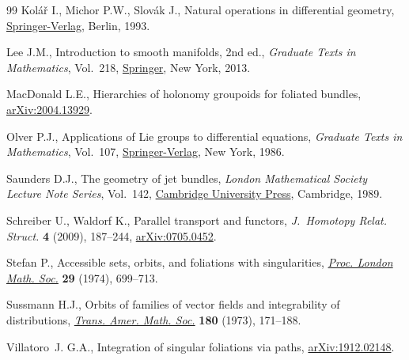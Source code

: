 \documentclass[11pt]{article}
\numberwithin{equation}{section}
\numberwithin{equation}{section}
\begin{document}
\begin{thebibliography}{99}
Kol\'a\v{r} I., Michor P.W., Slov\'ak J., Natural operations in differential
 geometry, \href{https://doi.org/10.1007/978-3-662-02950-3}{Springer-Verlag}, Berlin, 1993.

Lee J.M., Introduction to smooth manifolds, 2nd ed., \textit{Graduate Texts in
 Mathematics}, Vol.~218, \href{https://doi.org/10.1007/978-0-387-21752-9}{Springer}, New York, 2013.

MacDonald L.E., Hierarchies of holonomy groupoids for foliated bundles,
 \href{https://arxiv.org/abs/2004.13929}{arXiv:2004.13929}.

Olver P.J., Applications of {L}ie groups to differential equations,
 \textit{Graduate Texts in Mathematics}, Vol.~107, \href{https://doi.org/10.1007/978-1-4684-0274-2}{Springer-Verlag}, New York,
 1986.

Saunders D.J., The geometry of jet bundles, \textit{London Mathematical Society
 Lecture Note Series}, Vol.~142, \href{https://doi.org/10.1017/CBO9780511526411}{Cambridge University Press}, Cambridge, 1989.

Schreiber U., Waldorf K., Parallel transport and functors, \textit{J.~Homotopy
 Relat. Struct.} \textbf{4} (2009), 187--244, \href{https://arxiv.org/abs/0705.0452}{arXiv:0705.0452}.

Stefan P., Accessible sets, orbits, and foliations with singularities,
 \href{https://doi.org/10.1112/plms/s3-29.4.699}{\textit{Proc. London Math. Soc.}} \textbf{29} (1974), 699--713.

Sussmann H.J., Orbits of families of vector fields and integrability of
 distributions, \href{https://doi.org/10.2307/1996660}{\textit{Trans. Amer. Math. Soc.}} \textbf{180} (1973),
 171--188.

Villatoro~J. G.A., Integration of singular foliations via paths,
 \href{https://arxiv.org/abs/1912.02148}{arXiv:1912.02148}.

\end{thebibliography}
\end{document}
